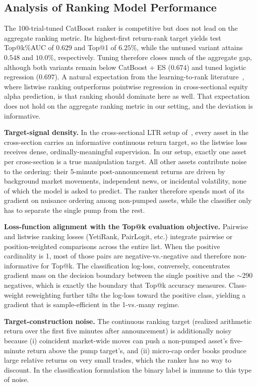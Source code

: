 \documentclass{ieeeaccess}
\begin{document}
\subsection{Analysis of Ranking Model Performance}

The 100-trial-tuned CatBoost ranker is competitive but does not lead on the aggregate ranking metric. Its highest-first return-rank target yields test Top@k\%AUC of $0.629$ and Top@1 of $6.25\%$, while the untuned variant attains $0.548$ and $10.0\%$, respectively. Tuning therefore closes much of the aggregate gap, although both variants remain below CatBoost + ES ($0.674$) and tuned logistic regression ($0.697$). A natural expectation from the learning-to-rank literature~\cite{poh_ltr}, where listwise ranking outperforms pointwise regression in cross-sectional equity alpha prediction, is that ranking should dominate here as well. That expectation does not hold on the aggregate ranking metric in our setting, and the deviation is informative.

\textbf{Target-signal density.}
In the cross-sectional LTR setup of~\cite{poh_ltr}, every asset in the cross-section carries an informative continuous return target, so the listwise loss receives dense, ordinally-meaningful supervision. In our setup, exactly one asset per cross-section is a true manipulation target. All other assets contribute noise to the ordering: their 5-minute post-announcement returns are driven by background market movements, independent news, or incidental volatility, none of which the model is asked to predict. The ranker therefore spends most of its gradient on nuisance ordering among non-pumped assets, while the classifier only has to separate the single pump from the rest.

\textbf{Loss-function alignment with the Top@k evaluation objective.}
Pairwise and listwise ranking losses (YetiRank, PairLogit, etc.) integrate pairwise or position-weighted comparisons across the entire list. When the positive cardinality is 1, most of those pairs are negative-vs.-negative and therefore non-informative for Top@k. The classification log-loss, conversely, concentrates gradient mass on the decision boundary between the single positive and the $\sim$290 negatives, which is exactly the boundary that Top@k accuracy measures. Class-weight reweighting further tilts the log-loss toward the positive class, yielding a gradient that is sample-efficient in the 1-vs.-many regime.

\textbf{Target-construction noise.}
The continuous ranking target (realized arithmetic return over the first five minutes after announcement) is additionally noisy because (i) coincident market-wide moves can push a non-pumped asset's five-minute return above the pump target's, and (ii) micro-cap order books produce large relative returns on very small trades, which the ranker has no way to discount. In the classification formulation the binary label is immune to this type of noise.
\end{document}
